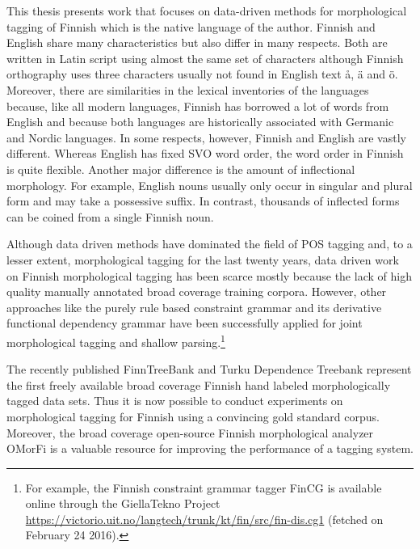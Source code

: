 This thesis presents work that focuses on data-driven methods for
morphological tagging of Finnish which is the native language of the
author. Finnish and English share many characteristics but also differ
in many respects. Both are written in Latin script using almost the
same set of characters although Finnish orthography uses three
characters usually not found in English text å, ä and ö. Moreover,
there are similarities in the lexical inventories of the languages
because, like all modern languages, Finnish has borrowed a lot of
words from English and because both languages are historically
associated with Germanic and Nordic languages. In some respects,
however, Finnish and English are vastly different. Whereas English has
fixed SVO word order, the word order in Finnish is quite
flexible. Another major difference is the amount of inflectional
morphology. For example, English nouns usually only occur in singular
and plural form and may take a possessive suffix. In contrast,
thousands of inflected forms can be coined from a single Finnish noun.

Although data driven methods have dominated the field of POS tagging
and, to a lesser extent, morphological tagging for the last twenty
years, data driven work on Finnish morphological tagging has been
scarce mostly because the lack of high quality manually annotated
broad coverage training corpora. However, other approaches like the
purely rule based constraint grammar \citep{Karlsson1995} and its
derivative functional dependency grammar \citep{Tapanainen1997} have
been successfully applied for joint morphological tagging and
shallow parsing.\footnote{For example, the Finnish constraint grammar
  tagger FinCG is available online through the GiellaTekno Project
  \citep{gt}
  \url{https://victorio.uit.no/langtech/trunk/kt/fin/src/fin-dis.cg1}
  (fetched on February 24 2016).}

The recently published FinnTreeBank \citep{Voutilainen2011} and Turku
Dependence Treebank \citep{Haverinen2013} represent the first freely
available broad coverage Finnish hand labeled morphologically tagged
data sets. Thus it is now possible to conduct experiments on
morphological tagging for Finnish using a convincing gold standard
corpus. Moreover, the broad coverage open-source Finnish morphological
analyzer OMorFi \citep{Pirinen2011} is a valuable resource for
improving the performance of a tagging system. 

